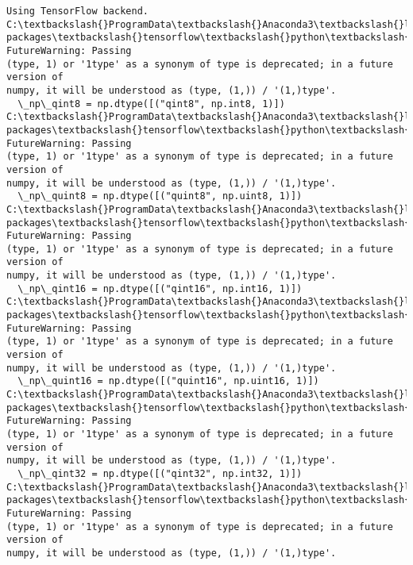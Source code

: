 \documentclass[11pt]{article}
\begin{document}
    \begin{Verbatim}[commandchars=\\\{\}]
Using TensorFlow backend.
C:\textbackslash{}ProgramData\textbackslash{}Anaconda3\textbackslash{}lib\textbackslash{}site-
packages\textbackslash{}tensorflow\textbackslash{}python\textbackslash{}framework\textbackslash{}dtypes.py:516: FutureWarning: Passing
(type, 1) or '1type' as a synonym of type is deprecated; in a future version of
numpy, it will be understood as (type, (1,)) / '(1,)type'.
  \_np\_qint8 = np.dtype([("qint8", np.int8, 1)])
C:\textbackslash{}ProgramData\textbackslash{}Anaconda3\textbackslash{}lib\textbackslash{}site-
packages\textbackslash{}tensorflow\textbackslash{}python\textbackslash{}framework\textbackslash{}dtypes.py:517: FutureWarning: Passing
(type, 1) or '1type' as a synonym of type is deprecated; in a future version of
numpy, it will be understood as (type, (1,)) / '(1,)type'.
  \_np\_quint8 = np.dtype([("quint8", np.uint8, 1)])
C:\textbackslash{}ProgramData\textbackslash{}Anaconda3\textbackslash{}lib\textbackslash{}site-
packages\textbackslash{}tensorflow\textbackslash{}python\textbackslash{}framework\textbackslash{}dtypes.py:518: FutureWarning: Passing
(type, 1) or '1type' as a synonym of type is deprecated; in a future version of
numpy, it will be understood as (type, (1,)) / '(1,)type'.
  \_np\_qint16 = np.dtype([("qint16", np.int16, 1)])
C:\textbackslash{}ProgramData\textbackslash{}Anaconda3\textbackslash{}lib\textbackslash{}site-
packages\textbackslash{}tensorflow\textbackslash{}python\textbackslash{}framework\textbackslash{}dtypes.py:519: FutureWarning: Passing
(type, 1) or '1type' as a synonym of type is deprecated; in a future version of
numpy, it will be understood as (type, (1,)) / '(1,)type'.
  \_np\_quint16 = np.dtype([("quint16", np.uint16, 1)])
C:\textbackslash{}ProgramData\textbackslash{}Anaconda3\textbackslash{}lib\textbackslash{}site-
packages\textbackslash{}tensorflow\textbackslash{}python\textbackslash{}framework\textbackslash{}dtypes.py:520: FutureWarning: Passing
(type, 1) or '1type' as a synonym of type is deprecated; in a future version of
numpy, it will be understood as (type, (1,)) / '(1,)type'.
  \_np\_qint32 = np.dtype([("qint32", np.int32, 1)])
C:\textbackslash{}ProgramData\textbackslash{}Anaconda3\textbackslash{}lib\textbackslash{}site-
packages\textbackslash{}tensorflow\textbackslash{}python\textbackslash{}framework\textbackslash{}dtypes.py:525: FutureWarning: Passing
(type, 1) or '1type' as a synonym of type is deprecated; in a future version of
numpy, it will be understood as (type, (1,)) / '(1,)type'.

\end{Verbatim}
\end{document}
